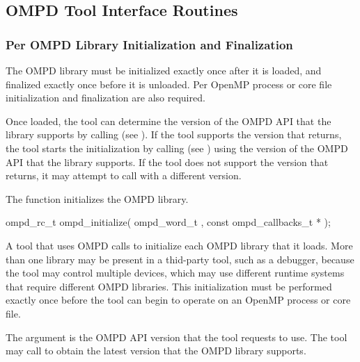 
\subsection{OMPD Tool Interface Routines}
\label{subsec:ompd-api}

\subsubsection{Per OMPD Library Initialization and Finalization}

The OMPD library must be initialized exactly once after it is loaded, 
and finalized exactly once before it is unloaded. Per OpenMP process 
or core file initialization and finalization are also required.

Once loaded, the tool can determine the version of the OMPD API that 
the library supports by calling  (see
). If the tool supports the 
version that  returns, the tool starts the 
initialization by calling  (see
) using the version of the OMPD API 
that the library supports. If the tool does not support the version that
 returns, it may attempt to call 
 with a different version.



\label{subsubsubsec:ompd_initialize}

\summary
The  function initializes the OMPD library.

\format
\begin{cspecific}
\begin{ompSyntax}
ompd_rc_t ompd_initialize(
  ompd_word_t ,
  const ompd_callbacks_t *
);
\end{ompSyntax}
\end{cspecific}

\descr
A tool that uses OMPD calls  to initialize each OMPD 
library that it loads. More than one library may be present in a thid-party 
tool, such as a debugger, because the tool may control multiple devices, which
may use different runtime systems that require different OMPD libraries. This 
initialization must be performed exactly once before the tool can begin to 
operate on an OpenMP process or core file.

\argdesc
The  argument is the OMPD API version that the tool requests
to use. The tool may call  to obtain the latest 
version that the OMPD library supports.

